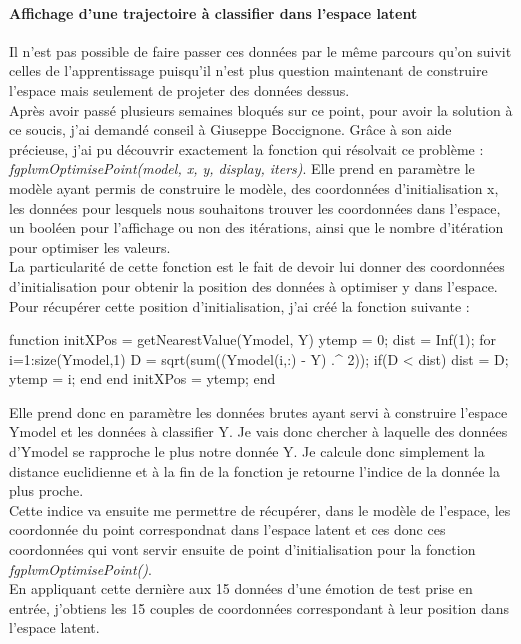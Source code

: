 \documentclass[poster]{polytech/polytech}
\begin{document}
\paragraph{Affichage d'une trajectoire à classifier dans l'espace latent}
Il n'est pas possible de faire passer ces données par le même parcours qu'on suivit celles de l'apprentissage puisqu'il n'est plus question maintenant de construire l'espace mais seulement de projeter des données dessus.\\
Après avoir passé plusieurs semaines bloqués sur ce point, pour avoir la solution à ce soucis, j'ai demandé conseil à Giuseppe Boccignone. Grâce à son aide précieuse, j'ai pu découvrir exactement la fonction qui résolvait ce problème : \textit{fgplvmOptimisePoint(model, x, y, display, iters)}. Elle prend en paramètre le modèle ayant permis de construire le modèle, des coordonnées d'initialisation x, les données pour lesquels nous souhaitons trouver les coordonnées dans l'espace, un booléen pour l'affichage ou non des itérations, ainsi que le nombre d'itération pour optimiser les valeurs.\\
La particularité de cette fonction est le fait de devoir lui donner des coordonnées d'initialisation pour obtenir la position des données à optimiser y dans l'espace.\\
Pour récupérer cette position d'initialisation, j'ai créé la fonction suivante :
\begin{matlabsource}
function initXPos = getNearestValue(Ymodel, Y)
    ytemp = 0;
    dist = Inf(1);
    for i=1:size(Ymodel,1)
        D = sqrt(sum((Ymodel(i,:) - Y) .^ 2));
        if(D < dist)
            dist = D;
            ytemp = i;
        end
    end
    initXPos = ytemp;
end
\end{matlabsource}
Elle prend donc en paramètre les données brutes ayant servi à construire l'espace Ymodel et les données à classifier Y. Je vais donc chercher à laquelle des données d'Ymodel se rapproche le plus notre donnée Y. Je calcule donc simplement la distance euclidienne et à la fin de la fonction je retourne l'indice de la donnée la plus proche.\\
Cette indice va ensuite me permettre de récupérer, dans le modèle de l'espace, les coordonnée du point correspondnat dans l'espace latent et ces donc ces coordonnées qui vont servir ensuite de point d'initialisation pour la fonction \textit{fgplvmOptimisePoint()}.\\
En appliquant cette dernière aux 15 données d'une émotion de test prise en entrée, j'obtiens les 15 couples de coordonnées correspondant à leur position dans l'espace latent.\\
\end{document}
